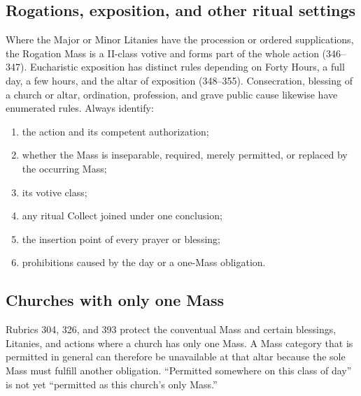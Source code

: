 \subsection{Rogations, exposition, and other ritual settings}

Where the Major or Minor Litanies have the procession or ordered supplications, the Rogation Mass is a II-class votive and forms part of the whole action (346--347). Eucharistic exposition has distinct rules depending on Forty Hours, a full day, a few hours, and the altar of exposition (348--355). Consecration, blessing of a church or altar, ordination, profession, and grave public cause likewise have enumerated rules. Always identify:

\begin{enumerate}[leftmargin=1.45em]
\item the action and its competent authorization;
\item whether the Mass is inseparable, required, merely permitted, or replaced by the occurring Mass;
\item its votive class;
\item any ritual Collect joined under one conclusion;
\item the insertion point of every prayer or blessing;
\item prohibitions caused by the day or a one-Mass obligation.
\end{enumerate}

\subsection{Churches with only one Mass}

Rubrics 304, 326, and 393 protect the conventual Mass and certain blessings, Litanies, and actions where a church has only one Mass. A Mass category that is permitted in general can therefore be unavailable at that altar because the sole Mass must fulfill another obligation. “Permitted somewhere on this class of day” is not yet “permitted as this church's only Mass.”

